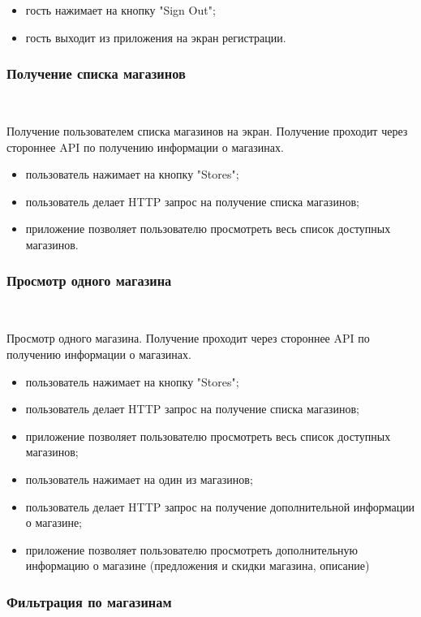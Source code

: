 \begin{itemize}
  \item гость нажимает на кнопку "Sign Out";
  \item гость выходит из приложения на экран регистрации.
\end{itemize}

\subsubsection{Получение списка магазинов}~\par

Получение пользователем списка магазинов на экран. Получение проходит через стороннее API по получению информации о магазинах.

\begin{itemize}
  \item пользователь нажимает на кнопку "Stores";
  \item пользователь делает HTTP запрос на получение списка магазинов;
  \item приложение позволяет пользователю просмотреть весь список доступных магазинов.
\end{itemize}


\subsubsection{Просмотр одного магазина}~\par

Просмотр одного магазина. Получение проходит через стороннее API по получению информации о магазинах.

\begin{itemize}
  \item пользователь нажимает на кнопку "Stores";
  \item пользователь делает HTTP запрос на получение списка магазинов;
  \item приложение позволяет пользователю просмотреть весь список доступных магазинов;
  \item пользователь нажимает на один из магазинов;
  \item пользователь делает HTTP запрос на получение дополнительной информации о магазине;
  \item приложение позволяет пользователю просмотреть дополнительную информацию о магазине (предложения и скидки магазина, описание)
\end{itemize}

\subsubsection{Фильтрация по магазинам}~\par

